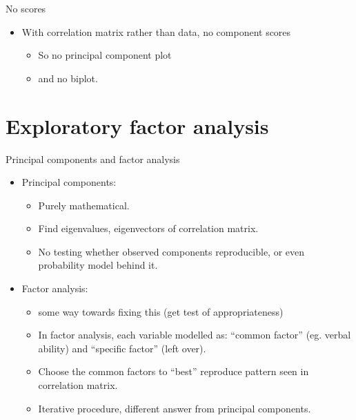 \documentclass[
  ignorenonframetext,
]{beamer}
\begin{document}
\begin{frame}{No scores}
\protect\hypertarget{no-scores}{}

\begin{itemize}
\item
  With correlation matrix rather than data, no component scores

  \begin{itemize}
  \item
    So no principal component plot
  \item
    and no biplot.
  \end{itemize}
\end{itemize}

\end{frame}

\hypertarget{exploratory-factor-analysis}{%
\section{Exploratory factor
analysis}\label{exploratory-factor-analysis}}

\begin{frame}{Principal components and factor analysis}
\protect\hypertarget{principal-components-and-factor-analysis}{}

\begin{itemize}
\item
  Principal components:

  \begin{itemize}
  \item
    Purely mathematical.
  \item
    Find eigenvalues, eigenvectors of correlation matrix.
  \item
    No testing whether observed components reproducible, or even
    probability model behind it.
  \end{itemize}
\item
  Factor analysis:

  \begin{itemize}
  \item
    some way towards fixing this (get test of appropriateness)
  \item
    In factor analysis, each variable modelled as: ``common factor''
    (eg. verbal ability) and ``specific factor'' (left over).
  \item
    Choose the common factors to ``best'' reproduce pattern seen in
    correlation matrix.
  \item
    Iterative procedure, different answer from principal components.
  \end{itemize}
\end{itemize}

\end{frame}
\end{document}
